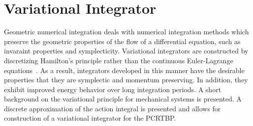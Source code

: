 \section{Variational Integrator}\label{sec:discrete_var}
Geometric numerical integration deals with numerical integration methods which preserve the geometric properties of the flow of a differential equation, such as invaraint properties and symplecticity.
Variational integrators are constructed by discretizing Hamilton's principle rather than the continuous Euler-Lagrange equations~\cite{marsden2001}.
As a result, integrators developed in this manner have the desirable properties that they are symplectic and momentum preserving.
In addition, they exhibit improved energy behavior over long integration periods.
A short background on the variational principle for mechanical systems is presented. 
A discrete approximation of the action integral is presented and allows for construction of a variational integrator for the PCRTBP.

